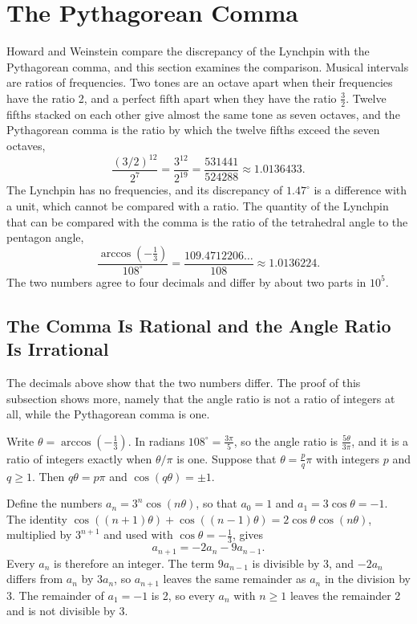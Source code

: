 \documentclass[a4paper,12pt]{article}
\begin{document}
\section{The Pythagorean Comma}
\label{sec:comma}
Howard and Weinstein compare the discrepancy of the Lynchpin with the Pythagorean comma, and this section examines the comparison. Musical intervals are ratios of frequencies. Two tones are an octave apart when their frequencies have the ratio 2, and a perfect fifth apart when they have the ratio \( \frac{3}{2} \). Twelve fifths stacked on each other give almost the same tone as seven octaves, and the Pythagorean comma is the ratio by which the twelve fifths exceed the seven octaves,
\[
\frac{(3/2)^{12}}{2^7} = \frac{3^{12}}{2^{19}} = \frac{531441}{524288} \approx 1.0136433 .
\]
The Lynchpin has no frequencies, and its discrepancy of \( 1.47^\circ \) is a difference with a unit, which cannot be compared with a ratio. The quantity of the Lynchpin that can be compared with the comma is the ratio of the tetrahedral angle to the pentagon angle,
\[
\frac{\arccos(-\frac{1}{3})}{108^\circ} = \frac{109.4712206\ldots}{108} \approx 1.0136224 .
\]
The two numbers agree to four decimals and differ by about two parts in \( 10^5 \).

\subsection{The Comma Is Rational and the Angle Ratio Is Irrational}
The decimals above show that the two numbers differ. The proof of this subsection shows more, namely that the angle ratio is not a ratio of integers at all, while the Pythagorean comma is one.

Write \( \theta = \arccos(-\frac{1}{3}) \). In radians \( 108^\circ = \frac{3\pi}{5} \), so the angle ratio is \( \frac{5\theta}{3\pi} \), and it is a ratio of integers exactly when \( \theta/\pi \) is one. Suppose that \( \theta = \frac{p}{q}\pi \) with integers \( p \) and \( q \geq 1 \). Then \( q\theta = p\pi \) and \( \cos(q\theta) = \pm 1 \).

Define the numbers \( a_n = 3^n \cos(n\theta) \), so that \( a_0 = 1 \) and \( a_1 = 3\cos\theta = -1 \). The identity \( \cos((n+1)\theta) + \cos((n-1)\theta) = 2\cos\theta\cos(n\theta) \), multiplied by \( 3^{n+1} \) and used with \( \cos\theta = -\frac{1}{3} \), gives
\[
a_{n+1} = -2a_n - 9a_{n-1} .
\]
Every \( a_n \) is therefore an integer. The term \( 9a_{n-1} \) is divisible by 3, and \( -2a_n \) differs from \( a_n \) by \( 3a_n \), so \( a_{n+1} \) leaves the same remainder as \( a_n \) in the division by 3. The remainder of \( a_1 = -1 \) is 2, so every \( a_n \) with \( n \geq 1 \) leaves the remainder 2 and is not divisible by 3.
\end{document}
